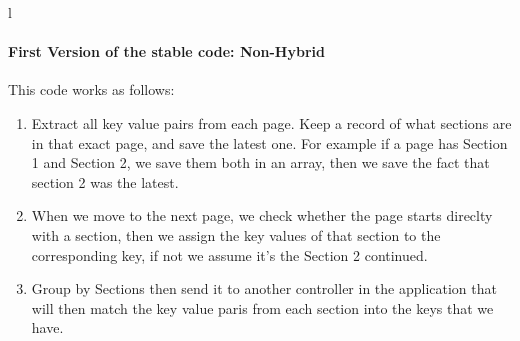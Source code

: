 l\documentclass[a4paper,12pt,twoside]{report}
\begin{document}
\paragraph{First Version of the stable code: Non-Hybrid}
This code works as follows: 
\begin{enumerate}
\item Extract all key value pairs from each page. Keep a record of what sections are in that exact page, and save the latest one. For example if a page has Section 1 and Section 2, we save them both in an array, then we save the fact that section 2 was the latest. 
\item When we move to the next page, we check whether the page starts direclty with a section, then we assign the key values of that section to the corresponding key, if not we assume it's the Section 2 continued.
\item Group by Sections then send it to another controller in the application that will then match the key value paris from each section into the keys that we have.
\end{enumerate}
\end{document}
